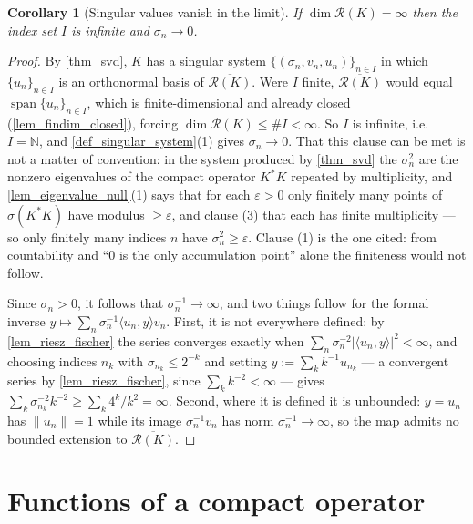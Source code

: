 \documentclass[a4paper]{report}
\theoremstyle{plain}
\newtheorem{corollary}[theorem]{Corollary}
\theoremstyle{definition}
\theoremstyle{remark}
\begin{document}
\begin{corollary}[Singular values vanish in the limit]
  \label{cor_sigma_null}
  If $\dim\mathcal{R}(K) = \infty$ then the index set $I$ is infinite and
  $\sigma_n \to 0$.
\end{corollary}
\begin{proof}
  By \cref{thm_svd}, $K$ has a singular system $\{(\sigma_n,v_n,u_n)\}_{n\in I}$ in which
  $\{u_n\}_{n\in I}$ is an orthonormal basis of $\overline{\mathcal{R}(K)}$.  Were $I$
  finite, $\overline{\mathcal{R}(K)}$ would equal $\operatorname{span}\{u_n\}_{n\in I}$,
  which is finite-dimensional and already closed (\cref{lem_findim_closed}), forcing
  $\dim\mathcal{R}(K) \le \#I < \infty$.  So $I$ is infinite, i.e.\ $I = \mathbb{N}$, and
  \cref{def_singular_system}(1) gives $\sigma_n \to 0$.  That this clause can be met is not
  a matter of convention: in the system produced by \cref{thm_svd} the $\sigma_n^2$ are the
  nonzero eigenvalues of the compact operator $K^*K$ repeated by multiplicity, and
  \cref{lem_eigenvalue_null}(1) says that for each $\varepsilon > 0$ only finitely many
  points of $\sigma(K^*K)$ have modulus $\ge \varepsilon$, and clause (3) that each has
  finite multiplicity --- so only finitely many indices $n$ have $\sigma_n^2 \ge \varepsilon$.
  Clause (1) is the one cited: from countability and ``$0$ is the only accumulation point''
  alone the finiteness would not follow.

  Since $\sigma_n > 0$, it follows that $\sigma_n^{-1} \to \infty$, and two things follow
  for the formal inverse $y \mapsto \sum_n\sigma_n^{-1}\langle u_n,y\rangle v_n$.  First,
  it is not everywhere defined: by \cref{lem_riesz_fischer} the series converges exactly
  when $\sum_n\sigma_n^{-2}|\langle u_n,y\rangle|^2 < \infty$, and choosing indices $n_k$
  with $\sigma_{n_k} \le 2^{-k}$ and setting $y := \sum_k k^{-1}u_{n_k}$ --- a convergent
  series by \cref{lem_riesz_fischer}, since $\sum_kk^{-2} < \infty$ --- gives
  $\sum_k\sigma_{n_k}^{-2}k^{-2} \ge \sum_k 4^k/k^2 = \infty$.  Second, where it is defined
  it is unbounded: $y = u_n$ has $\|u_n\| = 1$ while its image $\sigma_n^{-1}v_n$ has norm
  $\sigma_n^{-1} \to \infty$, so the map admits no bounded extension to
  $\overline{\mathcal{R}(K)}$.
\end{proof}




\chapter{Functions of a compact operator}
\label{ch_09_functions_of_compact_operator}
\end{document}
